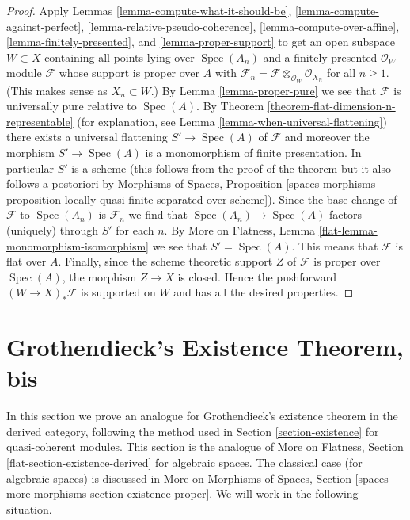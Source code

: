 \documentclass{stacks-project}
\theoremstyle{plain}
\theoremstyle{definition}
\theoremstyle{remark}
\numberwithin{equation}{subsection}
\def\Spec{\mathop{\mathrm{Spec}}}
\begin{document}
\begin{proof}
Apply Lemmas \ref{lemma-compute-what-it-should-be},
\ref{lemma-compute-against-perfect},
\ref{lemma-relative-pseudo-coherence},
\ref{lemma-compute-over-affine},
\ref{lemma-finitely-presented}, and
\ref{lemma-proper-support}
to get an open subspace $W \subset X$ containing all points
lying over $\Spec(A_n)$
and a finitely presented $\mathcal{O}_W$-module $\mathcal{F}$
whose support is proper over $A$ with
$\mathcal{F}_n = \mathcal{F} \otimes_{\mathcal{O}_W} \mathcal{O}_{X_n}$
for all $n \geq 1$. (This makes sense as $X_n \subset W$.)
By Lemma \ref{lemma-proper-pure} we see that $\mathcal{F}$
is universally pure relative to $\Spec(A)$.
By Theorem \ref{theorem-flat-dimension-n-representable}
(for explanation, see Lemma \ref{lemma-when-universal-flattening})
there exists a universal flattening $S' \to \Spec(A)$
of $\mathcal{F}$ and moreover the morphism $S' \to \Spec(A)$
is a monomorphism of finite presentation.
In particular $S'$ is a scheme (this follows from the proof
of the theorem but it also follows a postoriori by
Morphisms of Spaces, Proposition
\ref{spaces-morphisms-proposition-locally-quasi-finite-separated-over-scheme}).
Since the base change of $\mathcal{F}$ to $\Spec(A_n)$
is $\mathcal{F}_n$ we find that $\Spec(A_n) \to \Spec(A)$
factors (uniquely) through $S'$ for each $n$.
By More on Flatness, Lemma \ref{flat-lemma-monomorphism-isomorphism}
we see that $S' = \Spec(A)$.
This means that $\mathcal{F}$ is flat over $A$.
Finally, since the scheme theoretic support $Z$ of $\mathcal{F}$
is proper over $\Spec(A)$, the morphism $Z \to X$ is closed.
Hence the pushforward $(W \to X)_*\mathcal{F}$ is supported
on $W$ and has all the desired properties.
\end{proof}







\section{Grothendieck's Existence Theorem, bis}
\label{section-existence-derived}

\noindent
In this section we prove an analogue for Grothendieck's existence theorem
in the derived category, following the method used in
Section \ref{section-existence} for quasi-coherent modules.
This section is the analogue of
More on Flatness, Section \ref{flat-section-existence-derived}
for algebraic spaces. The classical case (for algebraic spaces)
is discussed in More on Morphisms of Spaces, Section
\ref{spaces-more-morphisms-section-existence-proper}.
We will work in the following situation.
\end{document}
